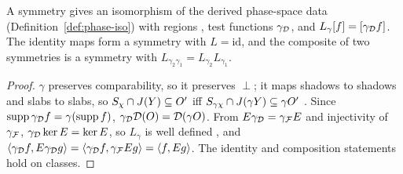 \begin{proposition}\label{prop:green-symmetry}
A symmetry  gives an isomorphism of the derived phase-space data (Definition~\ref{def:phase-iso})
with regions , test functions $\gamma_\mathcal D$, and 
$L_\gamma[f]=[\gamma_\mathcal D f]$.
The identity maps form a symmetry with $L=\mathrm{id}$, and the composite of two symmetries is a
symmetry with $L_{\gamma_2\gamma_1}=L_{\gamma_2}L_{\gamma_1}$.
\end{proposition}
\begin{proof}
$\gamma$ preserves comparability, so it preserves $\perp$; it maps shadows to shadows and slabs to
slabs, so $S_\chi\cap J(Y)\subseteq O'$ iff $S_{\gamma\chi}\cap J(\gamma Y)\subseteq\gamma O'$
. Since $\operatorname{supp}\gamma_\mathcal D f=\gamma(\operatorname{supp} f)$, $\gamma_\mathcal D\mathcal D(O)=\mathcal D(\gamma O)$. From
$E\gamma_\mathcal D=\gamma_\mathcal F E$ and injectivity of $\gamma_\mathcal F$, $\gamma_\mathcal D\ker E=\ker E$, so $L_\gamma$ is
well defined , and
$\langle\gamma_\mathcal D f,E\gamma_\mathcal D g\rangle=\langle\gamma_\mathcal D f,\gamma_\mathcal F Eg\rangle
=\langle f,Eg\rangle$. The identity and composition statements hold on classes.
\end{proof}
\noindent{}

